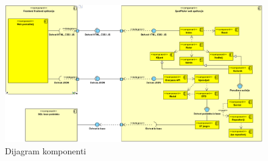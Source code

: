\vspace{10cm}

\begin{figure}[H]
	\includegraphics[width=\textwidth]{slike/dijagram_komponenti.png} %
	\centering
	\caption{Dijagram komponenti}
	\label{fig:dijagramaktivnosti}
\end{figure}


\eject 

